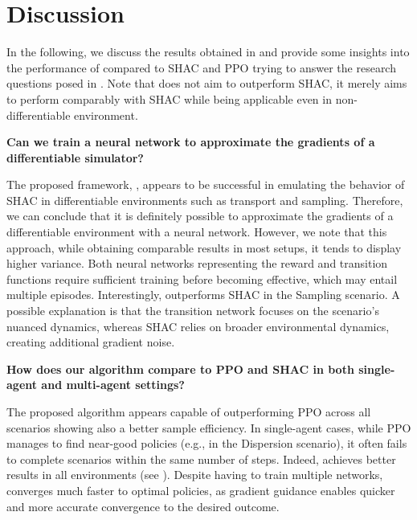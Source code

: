 \section{Discussion}
In the following, we discuss the results obtained in  and provide some insights into the performance of \fname{} compared to SHAC and PPO trying to answer the research questions posed in .
Note that \fname{} does not aim to outperform SHAC, it merely aims to perform comparably with SHAC while being applicable even in non-differentiable environment. 
\begin{center}
 \textbf{Can we train a neural network to approximate the gradients of a differentiable simulator?}
\end{center}

The proposed framework, \fname{}, appears to be successful in emulating the behavior of SHAC in differentiable environments such as transport and sampling. 
Therefore, we can conclude that it is definitely possible to approximate the gradients of a differentiable environment with a neural network. 
However, we note that this approach, while obtaining comparable results in most setups, it tends to display higher variance. 
Both neural networks representing the reward and transition functions require sufficient training before becoming effective, which may entail multiple episodes. Interestingly, \fname{} outperforms SHAC in the Sampling scenario. A possible explanation is that the transition network focuses on the scenario's nuanced dynamics, whereas SHAC relies on broader environmental dynamics, creating additional gradient noise.
\begin{center}
 \textbf{How does our algorithm compare to PPO and SHAC in both single-agent and multi-agent settings?}
\end{center}
The proposed algorithm appears capable of outperforming PPO across all scenarios showing also a better sample efficiency.
In single-agent cases, while PPO manages to find near-good policies (e.g., in the Dispersion scenario), 
it often fails to complete scenarios within the same number of steps. 
Indeed, \fname{} achieves better results in all environments (see ). 
Despite having to train multiple networks, \fname{} converges much faster to optimal policies, 
as gradient guidance enables quicker and more accurate convergence to the desired outcome. 
